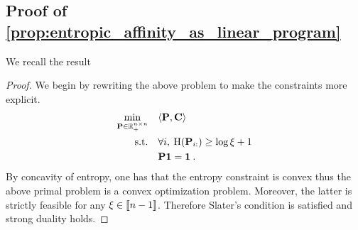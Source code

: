 \subsection{Proof of \cref{prop:entropic_affinity_as_linear_program}}

We recall the result
\entropicaffinityaslinearprogram*

\begin{proof}
We begin by rewriting the above problem to make the constraints more explicit.
\begin{align*}
    \min_{{\mathbf{P}} \in \mathbb{R}_+^{n \times n}} \quad &\langle {\mathbf{P}}, \mathbf{C} \rangle \\
    \text{s.t.} \quad &\forall i, \: \operatorname{H}({\mathbf{P}}_{i:}) \geq \log{\xi} + 1 \\
    & {\mathbf{P}} \bm{1} = \bm{1} \:.
\end{align*}
By concavity of entropy, one has that the entropy constraint is convex thus the above primal problem is a convex optimization problem. Moreover, the latter is strictly feasible for any $\xi \in {[\![n-1]\!]}$. Therefore Slater's condition is satisfied and strong duality holds.


\end{proof}
